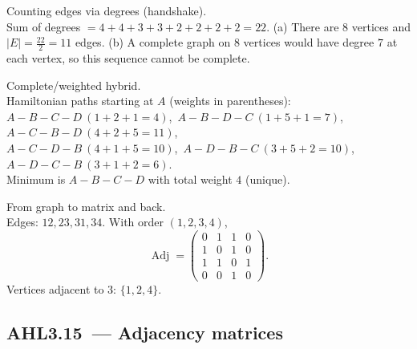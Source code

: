 \documentclass[11pt]{article}
\def\textbf#1{#1}%
\newcommand{\tocsubsection}[1]{\subsection{#1}}
\begin{document}
\begin{solution}
\textbf{Counting edges via degrees (handshake).}\\
Sum of degrees \(=4+4+3+3+2+2+2+2=22\).  
(a) There are \(8\) vertices and \(|E|=\tfrac{22}{2}=11\) edges.  
(b) A complete graph on \(8\) vertices would have degree \(7\) at each vertex, so this sequence cannot be complete.
\end{solution}

\begin{solution}
\textbf{Complete/weighted hybrid.}\\
Hamiltonian paths starting at \(A\) (weights in parentheses):\\
\(A\!-\!B\!-\!C\!-\!D\ (1+2+1=4)\),\ 
\(A\!-\!B\!-\!D\!-\!C\ (1+5+1=7)\),\ 
\(A\!-\!C\!-\!B\!-\!D\ (4+2+5=11)\),\\
\(A\!-\!C\!-\!D\!-\!B\ (4+1+5=10)\),\ 
\(A\!-\!D\!-\!B\!-\!C\ (3+5+2=10)\),\ 
\(A\!-\!D\!-\!C\!-\!B\ (3+1+2=6)\).\\
Minimum is \(\boxed{A\!-\!B\!-\!C\!-\!D}\) with total weight \(\boxed{4}\) (unique).
\end{solution}

\begin{solution}
\textbf{From graph to matrix and back.}\\
Edges: \(12,23,31,34\). With order \((1,2,3,4)\),
\[
\operatorname{Adj}=
\begin{pmatrix}
0&1&1&0\\
1&0&1&0\\
1&1&0&1\\
0&0&1&0
\end{pmatrix}.
\]
Vertices adjacent to \(3\): \(\{1,2,4\}\).
\end{solution}






\tocsubsection{AHL3.15 — Adjacency matrices}
\end{document}

